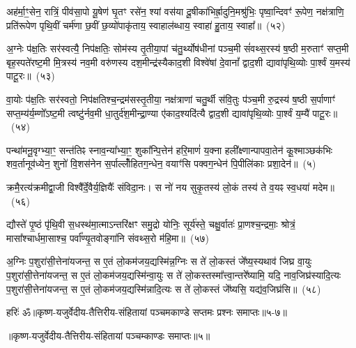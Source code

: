 अह॑र्मा॒ꣳ॒सेन॒ रात्रिं॒ पीव॑सा॒पो यू॒षेण॑ घृ॒तꣳ रसे॑न॒ श्यां वस॑या दू॒षीका॑भिर्\mbox{}ह्रा॒दुनि॒मश्रु॑भिः॒ पृष्वा॒न्दिवꣳ॑ रू॒पेण॒ नक्ष॑त्राणि॒ प्रति॑रूपेण पृथि॒वीं चर्म॑णा छ॒वीं छ॒व्यो॑पाकृ॑ताय॒ स्वाहाल॑ब्धाय॒ स्वाहा॑ हु॒ताय॒ स्वाहा᳚॥~(५२)\ip

{\anuvakamend[{अह॑र॒ष्टाविꣳ॑शतिः}]}%

अ॒ग्नेः प॑क्ष॒तिः सर॑स्वत्यै॒ निप॑क्षतिः॒ सोम॑स्य तृ॒तीया॒पां च॑तु॒र्थ्योष॑धीनां पञ्च॒मी सं॑वथ्स॒रस्य॑ ष॒ष्ठी म॒रुताꣳ॑ सप्त॒मी बृह॒स्पते॑रष्ट॒मी मि॒त्रस्य॑ नव॒मी वरु॑णस्य दश॒मीन्द्र॑स्यैकाद॒शी विश्वे॑षां दे॒वानां᳚ द्वाद॒शी द्यावा॑पृथि॒व्योः पा॒र्श्वं य॒मस्य॑ पाटू॒रः॥~(५३)\ip

{\anuvakamend[{अ॒ग्नेरेका॒न्नत्रि॒ꣳ॒शत्}]}%

वा॒योः प॑क्ष॒तिः सर॑स्वतो॒ निप॑क्षतिश्च॒न्द्रम॑सस्तृ॒तीया॒ नक्ष॑त्राणां चतु॒र्थी स॑वि॒तुः प॑ञ्च॒मी रु॒द्रस्य॑ ष॒ष्ठी स॒र्पाणाꣳ॑ सप्त॒म्य॑र्य॒म्णो᳚\-ऽष्ट॒मी त्वष्टु॑र्नव॒मी धा॒तुर्द॑श॒मीन्द्रा॒ण्या ए॑काद॒श्यदि॑त्यै द्वाद॒शी द्यावा॑पृथि॒व्योः पा॒र्श्वं य॒म्यै॑ पाटू॒रः॥~(५४)\ip

{\anuvakamend[{वा॒योर॒ष्टाविꣳ॑शतिः}]}%

पन्था॑मनू॒वृग्भ्या॒ꣳ॒ सन्त॑तिꣴ स्नाव॒न्या᳚भ्या॒ꣳ॒ शुका᳚न्पि॒त्तेन॑ हरि॒माणं॑ य॒क्ना हली᳚क्ष्णान्पापवा॒तेन॑ कू॒श्माञ्छक॑भिः शव॒र्तानूव॑ध्येन॒ शुनो॑ वि॒शस॑नेन स॒र्पाल्लोँ॑हितग॒न्धेन॒ वयाꣳ॑सि पक्वग॒न्धेन॑ पि॒पीलि॑काः प्रशा॒देन॑॥~(५)\ip

{\anuvakamend[{पन्था॒न्द्वाविꣳ॑शतिः}]}%

क्रमै॒रत्य॑क्रमीद्वा॒जी विश्वै᳚र्दे॒वैर्य॒ज्ञियैः᳚ संविदा॒नः। स नो॑ नय सुकृ॒तस्य॑ लो॒कं तस्य॑ ते व॒यꣴ स्व॒धया॑ मदेम॥~(५६)\ip

{\anuvakamend[{क्रमै॑र॒ष्टाद॑श}]}%

द्यौस्ते॑ पृ॒ष्ठं पृ॑थि॒वी स॒धस्थ॑मा॒त्माऽन्तरि॑क्षꣳ समु॒द्रो योनिः॒ सूर्य॑स्ते॒ चक्षु॒र्वातः॑ प्रा॒णश्च॒न्द्रमाः॒ श्रोत्रं॒ मासा᳚श्चार्धमा॒साश्च॒ पर्वा᳚ण्यृ॒तवोङ्गा॑नि संवथ्स॒रो म॑हि॒मा॥~(५७)\ip

{\anuvakamend[{द्यौः पञ्च॑विꣳशतिः}]}%

अ॒ग्निः प॒शुरा॑सी॒त्तेना॑यजन्त॒ स ए॒तं लो॒कम॑जय॒द्यस्मि॑न्न॒ग्निः स ते॑ लो॒कस्तं जे᳚ष्य॒स्यथाव॑ जिघ्र वा॒युः प॒शुरा॑सी॒त्तेना॑यजन्त॒ स ए॒तं लो॒कम॑जय॒द्यस्मि॑न्वा॒युः स ते॑ लो॒कस्तस्मा᳚त्त्वा॒न्तरे᳚ष्यामि॒ यदि॒ नाव॒जिघ्र॑स्यादि॒त्यः प॒शुरा॑सी॒त्तेना॑यजन्त॒ स ए॒तं लो॒कम॑जय॒द्यस्मि॑न्नादि॒त्यः स ते॑ लो॒कस्तं जे᳚ष्यसि॒ यद्य॑व॒जिघ्र॑सि॥~(५८)\ip

{\anuvakamend[{यस्मि॑न्न॒ष्टौ च॑}]}%

{हरिः॑ ॐ}{॥कृष्ण-यजुर्वेदीय-तैत्तिरीय-संहितायां पञ्चमकाण्डे सप्तमः प्रश्नः समाप्तः॥५-७॥}

\centerline{॥कृष्ण-यजुर्वेदीय-तैत्तिरीय-संहितायां पञ्चम्काण्डः समाप्तः॥५॥}

\hyperref[sec:startkanda5]{\closesection}
